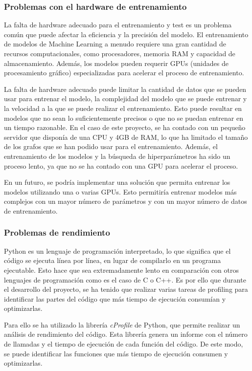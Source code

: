 \subsubsection{Problemas con el hardware de entrenamiento}
La falta de hardware adecuado para el entrenamiento y test es un problema común 
que puede afectar la eficiencia y la precisión del modelo. El entrenamiento de modelos 
de Machine Learning a menudo requiere una gran cantidad de recursos computacionales, 
como procesadores, memoria RAM y capacidad de almacenamiento. Además, los modelos 
pueden requerir GPUs (unidades de procesamiento gráfico) especializadas para acelerar 
el proceso de entrenamiento.\medskip

La falta de hardware adecuado puede limitar la cantidad de datos que se pueden usar 
para entrenar el modelo, la complejidad del modelo que se puede entrenar y la 
velocidad a la que se puede realizar el entrenamiento. Esto puede resultar en 
modelos que no sean lo suficientemente precisos o que no se puedan entrenar en 
un tiempo razonable. En el caso de este proyecto, se ha contado con un pequeño
servidor que disponía de una CPU y 4GB de RAM, lo que ha limitado el tamaño de los
grafos que se han podido usar para el entrenamiento. Además, el entrenamiento de
los modelos y la búsqueda de hiperparámetros ha sido un proceso lento, ya que
no se ha contado con una GPU para acelerar el proceso.\medskip

En un futuro, se podría implementar una solución que permita entrenar los modelos
utilizando una o varias GPUs. Esto permitiría entrenar modelos más complejos
con un mayor número de parámetros y con un mayor número de datos de entrenamiento.

\subsubsection{Problemas de rendimiento}
Python es un lenguaje de programación interpretado, lo que significa que el código
se ejecuta línea por línea, en lugar de compilarlo en un programa ejecutable. Esto
hace que sea extremadamente lento en comparación con otros lenguajes de programación
como es el caso de C o C++. Es por ello que durante el desarrollo del proyecto, se
ha tenido que realizar varias tareas de profiling para identificar las partes del
código que más tiempo de ejecución consumían y optimizarlas.\medskip

Para ello se ha utilizado la librería \textit{cProfile} \cite{cProfile} de Python, que permite
realizar un análisis de rendimiento del código. Esta librería genera un informe
con el número de llamadas y el tiempo de ejecución de cada función del código.
De este modo, se puede identificar las funciones que más tiempo de ejecución
consumen y optimizarlas.\medskip

